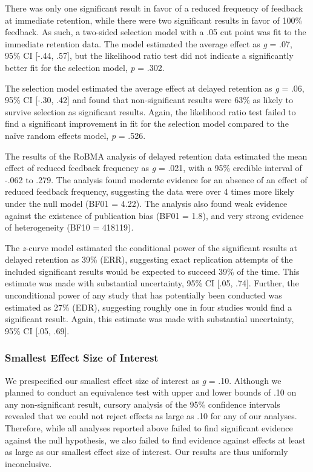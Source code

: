 \documentclass[
  english,
  man, donotrepeattitle,floatsintext]{apa7}
\begin{document}
There was only one significant result in favor of a reduced frequency of feedback at immediate retention, while there were two significant results in favor of 100\% feedback. As such, a two-sided selection model with a .05 cut point was fit to the immediate retention data. The model estimated the average effect as \emph{g} = .07, 95\% CI {[}-.44, .57{]}, but the likelihood ratio test did not indicate a significantly better fit for the selection model, \emph{p} = .302.

The selection model estimated the average effect at delayed retention as \emph{g} = .06, 95\% CI {[}-.30, .42{]} and found that non-significant results were 63\% as likely to survive selection as significant results. Again, the likelihood ratio test failed to find a significant improvement in fit for the selection model compared to the naïve random effects model, \emph{p} = .526.

The results of the RoBMA analysis of delayed retention data estimated the mean effect of reduced feedback frequency as \emph{g} = .021, with a 95\% credible interval of -.062 to .279. The analysis found moderate evidence for an absence of an effect of reduced feedback frequency, suggesting the data were over 4 times more likely under the null model (BF01 = 4.22). The analysis also found weak evidence against the existence of publication bias (BF01 = 1.8), and very strong evidence of heterogeneity (BF10 = 418119).

The \emph{z}-curve model estimated the conditional power of the significant results at delayed retention as 39\% (ERR), suggesting exact replication attempts of the included significant results would be expected to succeed 39\% of the time. This estimate was made with substantial uncertainty, 95\% CI {[}.05, .74{]}. Further, the unconditional power of any study that has potentially been conducted was estimated as 27\% (EDR), suggesting roughly one in four studies would find a significant result. Again, this estimate was made with substantial uncertainty, 95\% CI {[}.05, .69{]}.

\hypertarget{smallest-effect-size-of-interest}{%
\subsubsection{Smallest Effect Size of Interest}\label{smallest-effect-size-of-interest}}

We prespecified our smallest effect size of interest as \emph{g} = .10. Although we planned to conduct an equivalence test with upper and lower bounds of .10 on any non-significant result, cursory analysis of the 95\% confidence intervals revealed that we could not reject effects as large as .10 for any of our analyses. Therefore, while all analyses reported above failed to find significant evidence against the null hypothesis, we also failed to find evidence against effects at least as large as our smallest effect size of interest. Our results are thus uniformly inconclusive.
\end{document}
